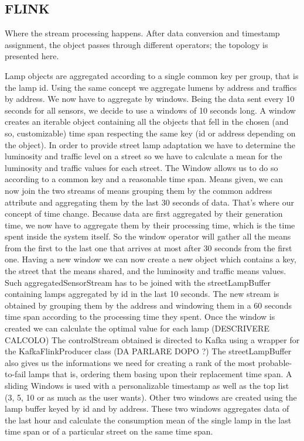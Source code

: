 \subsection{FLINK}
Where the stream processing happens. After data conversion and timestamp assignment, the object passes through different operators; the topology is presented here.


Lamp objects are aggregated according to a single common key per group, that is the lamp id. Using the same concept we aggregate lumens by address and traffics by address.
We now have to aggregate by windows. Being the data sent every 10 seconds for all sensors, we decide to use a windows of 10 seconds long. A window creates an iterable object containing all the objects that fell in the chosen (and so, customizable) time span respecting the same key (id or address depending on the object). In order to provide street lamp adaptation we have to determine the luminosity and traffic level on a street so we have to calculate a mean for the luminosity and traffic values for each street. The Window allows us to do so according to a common key and a reasonable time span. Means given, we can now join the two streams of means grouping them by the common address attribute and aggregating them by the last 30 seconds of data. That’s where our concept of time change. Because data are first aggregated by their generation time, we now have to aggregate them by their processing time, which is the time spent inside the system itself. So the window operator will gather all the means from the first to the last one that arrives at most after 30 seconds from the first one. Having a new window we can now create a new object which contains a key, the street that the means shared, and the luminosity and traffic means values.
Such aggregatedSensorStream has to be joined with the streetLampBuffer containing lamps aggregated by id in the last 10 seconds. The new stream is obtained by grouping them by the address and windowing them in a 60 seconds time span according to the processing time they spent. Once the window is created we can calculate the optimal value for each lamp
(DESCRIVERE CALCOLO)
The controlStream obtained is directed to Kafka using a wrapper for the KafkaFlinkProducer class (DA PARLARE DOPO ?)
The streetLampBuffer also gives us the informations we need for creating a rank of the most probable-to-fail lamps that is, ordering them basing upon their replacement time span. A sliding Windows is used with a personalizable timestamp as well as the top list (3, 5, 10 or as much as the user wants). Other two windows are created using the lamp buffer keyed by id and by address. These two windows aggregates data of the last hour and calculate the consumption mean of the single lamp in the last time span or of a particular street on the same time span.

